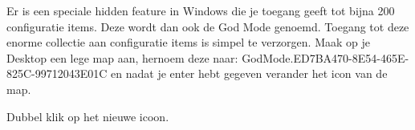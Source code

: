 Er is een speciale hidden feature in Windows die je toegang geeft tot bijna 200 configuratie items. Deze wordt dan ook de God Mode genoemd. Toegang tot deze enorme collectie aan configuratie items is simpel te verzorgen. Maak op je Desktop een lege map aan, hernoem deze naar: GodMode.{ED7BA470-8E54-465E-825C-99712043E01C} en nadat je enter hebt gegeven verander het icon van de map.

\begin{minipage}[t]{\linewidth}
\raggedright
{}
\end{minipage}

Dubbel klik op het nieuwe icoon.

\begin{minipage}[t]{\linewidth}
\raggedright
{}
\end{minipage}
